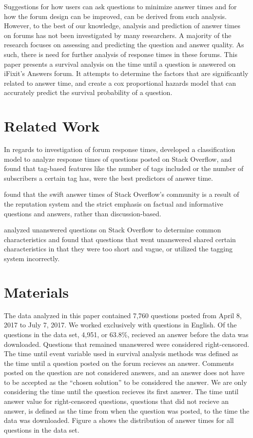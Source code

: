 \documentclass[12pt]{article}
\begin{document}
    Suggestions for how users can ask questions to minimize answer times and for how the forum design can be improved, can be derived from such analysis. However, to the best of our knowledge, analysis and prediction of answer times on forums has not been investigated by many researchers. A majority of the research focuses on assessing and predicting the question and answer quality. As such, there is need for further analysis of response times in these forums. This paper presents a survival analysis on the time until a question is answered on iFixit's Answers forum. It attempts to determine the factors that are significantly related to answer time, and create a cox proportional hazards model that can accurately predict the survival probability of a question.

\section{Related Work}

    In regards to investigation of forum response times, \citep{Bhat2014} developed a classification model to analyze response times of questions posted on Stack Overflow, and found that tag-based features like the number of tags included or the number of subscribers a certain tag has, were the best predictors of answer time. 

    \citep{Mamykina2011} found that the swift answer times of Stack Overflow's community is a result of the reputation system and the strict emphasis on factual and informative questions and answers, rather than discussion-based. 

    \citep{Asaduzzaman2013} analyzed unanswered questions on Stack Overflow to determine common characteristics and found that questions that went unanswered shared certain characteristics in that they were too short and vague, or utilized the tagging system incorrectly. 

\section{Materials}

    The data analyzed in this paper contained 7,760 questions posted from April 8, 2017 to July 7, 2017. We worked exclusively with questions in English. Of the questions in the data set, 4,951, or 63.8\%, recieved an answer before the data was downloaded. Questions that remained unanswered were considered right-censored. The time until event variable used in survival analysis methods was defined as the time until a question posted on the forum recieves an answer. Comments posted on the question are not considered answers, and an answer does not have to be accepted as the ``chosen solution'' to be considered the answer. We are only considering the time until the question recieves its first answer. The time until answer value for right-censored questions, questions that did not recieve an answer, is defined as the time from when the question was posted, to the time the data was downloaded. Figure a shows the distribution of answer times for all questions in the data set. 
    
\end{document}
